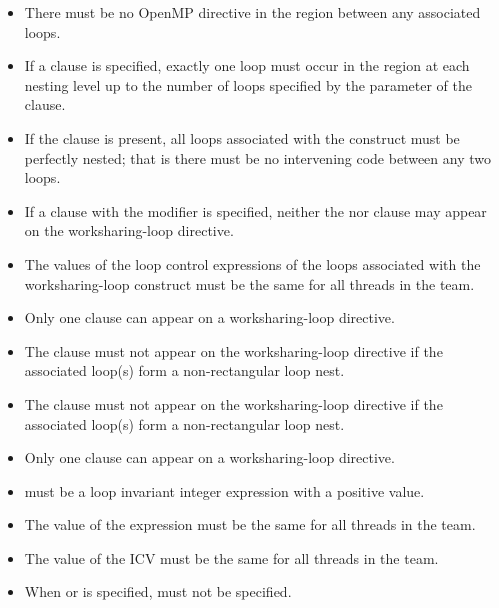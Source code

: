 \begin{itemize}
\item There must be no OpenMP directive in the region between any
associated loops.

\item If a  clause is specified, exactly one loop must
occur in the region at each nesting level up to the number of loops
specified by the parameter of the  clause.

\item If the  clause is present, all loops associated
with the construct must be perfectly nested; that is there must be
no intervening code between any two loops.

\item If a  clause with the  modifier is
    specified, neither the  nor  clause may appear
    on the worksharing-loop directive.

\item The values of the loop control expressions of the loops associated with
  the worksharing-loop construct must be the same for all threads in the team.

\item Only one  clause can appear on a worksharing-loop directive.

\item The  clause must not appear on the worksharing-loop directive if the
    associated loop(s) form a non-rectangular loop nest.

\item The  clause must not appear on the worksharing-loop directive if the
    associated loop(s) form a non-rectangular loop nest.

\item Only one  clause can appear on a worksharing-loop directive.

\item {} must be a loop invariant integer expression with a positive value.

\item The value of the  expression must be the same for all threads in the team.

\item The value of the  ICV must be the same for all threads in the team.

\item When  or  is specified,  must
not be specified.


\end{itemize}
